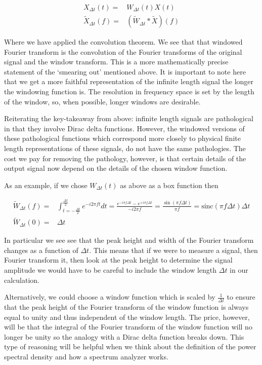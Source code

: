 \documentclass[12pt]{article}
\newcommand{\sinc}{\text{sinc}}
\begin{document}
\begin{align}
X_{\Delta t}(t) =& W_{\Delta t}(t) X(t)\\
\tilde{X}_{\Delta t}(f) =& (\tilde{W}_{\Delta t} \ast \tilde{X})(f)
\end{align}

Where we have applied the convolution theorem.
We see that that windowed Fourier transform is the convolution of the Fourier transforms of the original signal and the window transform.
This is a more mathematically precise statement of the `smearing out' mentioned above.
It is important to note here that we get a more faithful representation of the infinite length signal the longer the windowing function is.
The resolution in frequency space is set by the length of the window, so, when possible, longer windows are desirable.

Reiterating the key-takeaway from above: infinite length signals are pathological in that they involve Dirac delta functions.
However, the windowed versions of these pathological functions which correspond more closely to physical finite length representations of these signals, do not have the same pathologies.
The cost we pay for removing the pathology, however, is that certain details of the output signal now depend on the details of the chosen window function.

As an example, if we chose $W_{\Delta t}(t)$ as above as a box function then

\begin{align}
\tilde{W}_{\Delta t}(f) =& \int_{t = -\frac{\Delta t}{2}}^{\frac{\Delta t}{2}} e^{-i2\pi ft}dt = \frac{e^{-i \pi f\Delta t} - e^{+i \pi f \Delta t}}{-i 2 \pi f} = \frac{\sin(\pi f \Delta t)}{\pi f} = \sinc(\pi f \Delta t) \Delta t \\
\tilde{W}_{\Delta t}(0) =& \Delta t
\end{align}

In particular we see see that the peak height and width of the Fourier transform changes as a function of $\Delta t$.
This means that if we were to measure a signal, then Fourier transform it, then look at the peak height to determine the signal amplitude we would have to be careful to include the window length $\Delta t$ in our calculation.

Alternatively, we could choose a window function which is scaled by $\frac{1}{\Delta t}$ to ensure that the peak height of the Fourier transform of the window function is always equal to unity and thus independent of the window length. 
The price, however, will be that the integral of the Fourier transform of the window function will no longer be unity so the analogy with a Dirac delta function breaks down.
This type of reasoning will be helpful when we think about the definition of the power spectral density and how a spectrum analyzer works.
\end{document}

